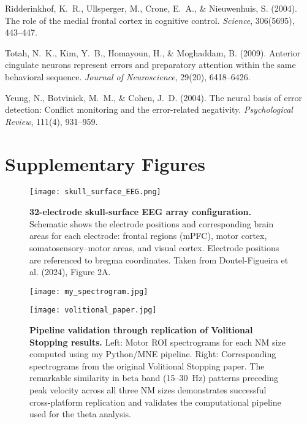 \documentclass[11pt]{article}
\begin{document}
\begin{thebibliography}{99}
Ridderinkhof, K.~R., Ullsperger, M., Crone, E.~A., \& Nieuwenhuis, S. (2004).
\newblock The role of the medial frontal cortex in cognitive control.
\newblock \emph{Science}, 306(5695), 443--447.


Totah, N.~K., Kim, Y.~B., Homayoun, H., \& Moghaddam, B. (2009).
\newblock Anterior cingulate neurons represent errors and preparatory attention within the same behavioral sequence.
\newblock \emph{Journal of Neuroscience}, 29(20), 6418--6426.


Yeung, N., Botvinick, M.~M., \& Cohen, J.~D. (2004).
\newblock The neural basis of error detection: Conflict monitoring and the error-related negativity.
\newblock \emph{Psychological Review}, 111(4), 931--959.

\end{thebibliography}

\section*{Supplementary Figures}

\begin{figure}[H]
\centering
\texttt{[image: skull\_surface\_EEG.png]}
\caption{\textbf{32-electrode skull-surface EEG array configuration.} Schematic shows the electrode positions and corresponding brain areas for each electrode: frontal regions (mPFC), motor cortex, somatosensory–motor areas, and visual cortex. Electrode positions are referenced to bregma coordinates. Taken from Doutel-Figueira et al. (2024), Figure 2A.}
\label{fig:electrode_array}
\end{figure}

\begin{figure}[H]
\centering
\begin{minipage}{0.35\textwidth}
\centering
\texttt{[image: my\_spectrogram.jpg]}
\end{minipage}
\hfill
\begin{minipage}{0.6\textwidth}
\centering
\texttt{[image: volitional\_paper.jpg]}
\end{minipage}
\caption{\textbf{Pipeline validation through replication of Volitional Stopping results.} Left: Motor ROI spectrograms for each NM size computed using my Python/MNE pipeline. Right: Corresponding spectrograms from the original Volitional Stopping paper. The remarkable similarity in beta band (15--30~Hz) patterns preceding peak velocity across all three NM sizes demonstrates successful cross-platform replication and validates the computational pipeline used for the theta analysis.}
\label{fig:validation}
\end{figure}
\end{document}

